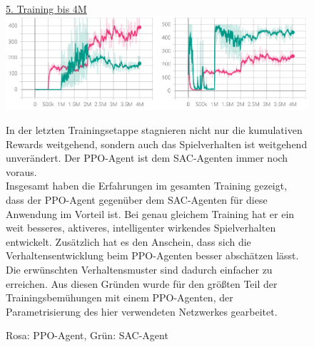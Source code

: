 \begin{figure} [h]
\underline{5. Training bis 4M} \\
\includegraphics[width=\textwidth]{images/centered2_erg}
\caption{Rosa: PPO-Agent, Grün: SAC-Agent}
In der letzten Trainingsetappe stagnieren nicht nur die kumulativen Rewards weitgehend, sondern auch das Spielverhalten ist weitgehend unverändert. Der PPO-Agent ist dem SAC-Agenten immer noch voraus. \\
Insgesamt haben die Erfahrungen im gesamten Training gezeigt, dass der PPO-Agent gegenüber dem SAC-Agenten für diese Anwendung im Vorteil ist. Bei genau gleichem Training hat er ein weit besseres, aktiveres, intelligenter wirkendes Spielverhalten entwickelt. Zusätzlich hat es den Anschein, dass sich die Verhaltensentwicklung beim PPO-Agenten besser abschätzen lässt. Die erwünschten Verhaltensmuster sind dadurch einfacher zu erreichen. Aus diesen Gründen wurde für den größten Teil der Trainingsbemühungen mit einem PPO-Agenten, der Parametrisierung des hier verwendeten Netzwerkes gearbeitet.
\end{figure}
